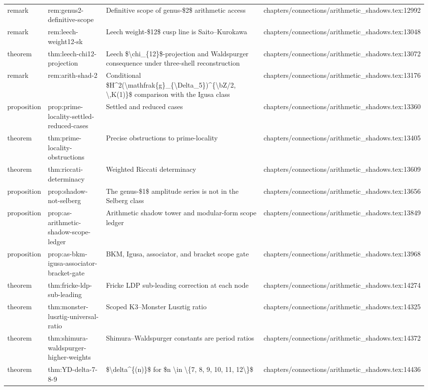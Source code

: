 \documentclass[11pt]{article}
\begin{document}
\begin{longtable}{L{0.10\textwidth}L{0.26\textwidth}L{0.42\textwidth}L{0.22\textwidth}}
remark & rem:genus2-definitive-scope & Definitive scope of genus-\$2\$ arithmetic access & chapters/connections/arithmetic\_shadows.tex:12992\\
remark & rem:leech-weight12-sk & Leech weight-\$12\$ cusp line is Saito--Kurokawa & chapters/connections/arithmetic\_shadows.tex:13048\\
theorem & thm:leech-chi12-projection & Leech \$\textbackslash{}chi\_\{12\}\$-projection and Waldspurger consequence under three-shell reconstruction & chapters/connections/arithmetic\_shadows.tex:13072\\
remark & rem:arith-shad-2 & Cond{}itional \$H\textasciicircum{}2(\textbackslash{}mathfrak\{g\}\_\{\textbackslash{}Delta\_5\})\textasciicircum{}\{\textbackslash{}bZ/2, \textbackslash{},K(1)\}\$ comparison with the Igusa class & chapters/connections/arithmetic\_shadows.tex:13176\\
proposition & prop:prime-locality-settled-reduced-cases & Settled and reduced cases & chapters/connections/arithmetic\_shadows.tex:13360\\
theorem & thm:prime-locality-obstructions & Precise obstructions to prime-locality & chapters/connections/arithmetic\_shadows.tex:13405\\
theorem & thm:riccati-determinacy & Weighted Riccati determinacy & chapters/connections/arithmetic\_shadows.tex:13609\\
proposition & prop:shadow-not-selberg & The genus-\$1\$ amplitude series is not in the Selberg class & chapters/connections/arithmetic\_shadows.tex:13656\\
proposition & prop:as-arithmetic-shadow-scope-led{}ger & Arithmetic shadow tower and modular-form scope led{}ger & chapters/connections/arithmetic\_shadows.tex:13849\\
proposition & prop:as-bkm-igusa-associator-bracket-gate & BKM, Igusa, associator, and bracket scope gate & chapters/connections/arithmetic\_shadows.tex:13968\\
theorem & thm:fricke-ldp-sub-leading & Fricke LDP sub-leading correction at each node & chapters/connections/arithmetic\_shadows.tex:14274\\
theorem & thm:monster-lusztig-universal-ratio & Scoped K3--Monster Lusztig ratio & chapters/connections/arithmetic\_shadows.tex:14325\\
theorem & thm:shimura-waldspurger-higher-weights & Shimura--Waldspurger constants are period ratios & chapters/connections/arithmetic\_shadows.tex:14372\\
theorem & thm:YD-delta-7-8-9 & \$\textbackslash{}delta\textasciicircum{}\{(n)\}\$ for \$n \textbackslash{}in \textbackslash{}\{7, 8, 9, 10, 11, 12\textbackslash{}\}\$ & chapters/connections/arithmetic\_shadows.tex:14436\\

\end{longtable}
\end{document}
